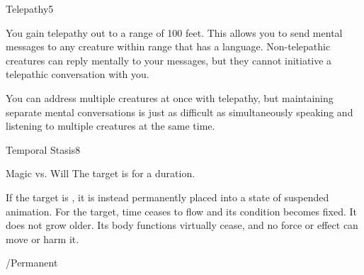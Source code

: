 \begin{spellsection}{Telepathy}{5}
\begin{spellheader}
    \begin{spelltargetinginfo}
    \end{spelltargetinginfo}
\end{spellheader}
\begin{spellcontent}
    \begin{spelleffects}
        \spelleffect You gain telepathy out to a range of 100 feet. This allows you to send mental messages to any creature within range that has a language. Non-telepathic creatures can reply mentally to your messages, but they cannot initiative a telepathic conversation with you.

        You can address multiple creatures at once with telepathy, but maintaining separate mental conversations is just as difficult as simultaneously speaking and listening to multiple creatures at the same time. 
        \spelldur \durlong
    \end{spelleffects}
\end{spellcontent}
\begin{spellfooter}
\end{spellfooter}
\end{spellsection}

\begin{spellsection}{Temporal Stasis}{8}
\begin{spellheader}
    \begin{spelltargetinginfo}
    \end{spelltargetinginfo}
\end{spellheader}
\begin{spellcontent}
    \begin{spelleffects}
        \begin{spellattack}{Magic vs. Will}
            \spellsuccess The target is \slowed for a \durlong duration.

            If the target is \bloodied, it is instead permanently placed into a state of suspended animation. For the target, time ceases to flow and its condition becomes fixed. It does not grow older. Its body functions virtually cease, and no force or effect can move or harm it.
        \end{spellattack}
        \spelldur \durlong/Permanent
    \end{spelleffects}
\end{spellcontent}
\begin{spellfooter}
\end{spellfooter}
\end{spellsection}

